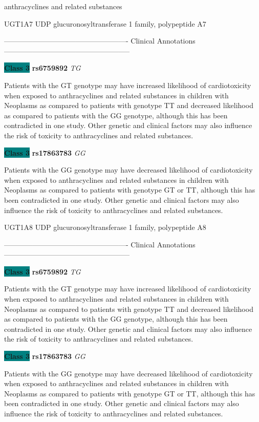 \documentclass{resume} %
\begin{document}
\begin{rSection}{ anthracyclines and related substances }
\begin{rSubsection}{ UGT1A7 }{ UDP glucuronosyltransferase 1 family, polypeptide A7 }{}{}
\item[] ---------------------------------------------------- Clinical Annotations -----------------------------------------------------\newline
\item \textbf{\colorbox{teal} {Class 3}} \textbf{ rs6759892 } \textit{ TG }
\item[] Patients with the GT genotype may have increased likelihood of cardiotoxicity when exposed to anthracyclines and related substances in children with Neoplasms as compared to patients with genotype TT and decreased likelihood as compared to patients with the GG genotype, although this has been contradicted in one study. Other genetic and clinical factors may also influence the risk of toxicity to anthracyclines and related substances. \item \textbf{\colorbox{teal} {Class 3}} \textbf{ rs17863783 } \textit{ GG }
\item[] Patients with the GG genotype may have decreased likelihood of cardiotoxicity when exposed to anthracyclines and related substances in children with Neoplasms as compared to patients with genotype GT or TT, although this has been contradicted in one study. Other genetic and clinical factors may also influence the risk of toxicity to anthracyclines and related substances.

\end{rSubsection}\begin{rSubsection}{ UGT1A8 }{ UDP glucuronosyltransferase 1 family, polypeptide A8 }{}{}
\item[]

\item[] ---------------------------------------------------- Clinical Annotations -----------------------------------------------------\newline
\item \textbf{\colorbox{teal} {Class 3}} \textbf{ rs6759892 } \textit{ TG }
\item[] Patients with the GT genotype may have increased likelihood of cardiotoxicity when exposed to anthracyclines and related substances in children with Neoplasms as compared to patients with genotype TT and decreased likelihood as compared to patients with the GG genotype, although this has been contradicted in one study. Other genetic and clinical factors may also influence the risk of toxicity to anthracyclines and related substances. \item \textbf{\colorbox{teal} {Class 3}} \textbf{ rs17863783 } \textit{ GG }
\item[] Patients with the GG genotype may have decreased likelihood of cardiotoxicity when exposed to anthracyclines and related substances in children with Neoplasms as compared to patients with genotype GT or TT, although this has been contradicted in one study. Other genetic and clinical factors may also influence the risk of toxicity to anthracyclines and related substances.


\end{rSubsection}
\end{rSection}
\end{document}
